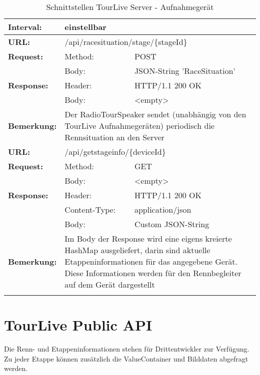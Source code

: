 {\begin{longtable}{ p{2.5cm} p{3.5cm} p{6cm}}
	\textbf{Interval:} & \multicolumn{2}{p{10cm}}{einstellbar} \\
\hline
\hline
	\textbf{URL:} & \multicolumn{2}{p{10cm}}{/api/racesituation/stage/\{stageId\}} \\
	\textbf{Request:} & Method: & POST \\
		& Body: & JSON-String 'RaceSituation'\\	
	\textbf{Response:} & Header: & HTTP/1.1 200 OK \\
		& Body: & <empty> \\	
	\textbf{Bemerkung:} & \multicolumn{2}{p{10cm}}{Der RadioTourSpeaker sendet (unabhängig von den TourLive Aufnahmegeräten) periodisch die Rennsituation an den Server} \\
\hline
\hline
	\textbf{URL:} & \multicolumn{2}{p{10cm}}{/api/getstageinfo/\{deviceId\}} \\
	\textbf{Request:} & Method: & GET \\
		& Body: & <empty>\\	
	\textbf{Response:} & Header: & HTTP/1.1 200 OK \\
		& Content-Type: & application/json \\
		& Body: & Custom JSON-String \\	
	\textbf{Bemerkung:} & \multicolumn{2}{p{10cm}}{Im Body der Response wird eine eigens kreierte HashMap ausgeliefert, darin sind aktuelle Etappeninformationen für das angegebene Gerät. Diese Informationen werden für den Rennbegleiter auf dem Gerät dargestellt} \\
\hline
\hline 
\caption{Schnittstellen TourLive Server - Aufnahmegerät}
\end{longtable} }

\section{TourLive Public API}
\label{sec:tourlivepublicapi}
Die Renn- und Etappeninformationen stehen für Drittentwickler zur Verfügung. Zu jeder Etappe können zusätzlich die ValueContainer und Bilddaten abgefragt werden.

